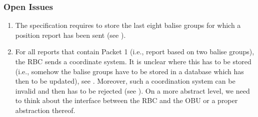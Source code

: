 \subsubsection{Open Issues}
\begin{enumerate}
	\item The specification requires to store the last eight balise groups for which a position report has been sent (see \cite[Chapter~3.6.2.2.2.c]{subset-026}).
	\item For all reports that contain Packet 1 (i.e., report based on two balise groups), the RBC sends a coordinate system. It is unclear where this has to be stored (i.e., somehow the balise groups have to be stored in a database which has then to be updated), see \cite[Chapter~3.4.2.3.3.6]{subset-026}. Moreover, such a coordination system can be invalid and then has to be rejected (see \cite[Chapter~3.4.2.3.3.7-8]{subset-026}). On a more abstract level, we need to think about the interface between the RBC and the OBU or a proper abstraction thereof.
\end{enumerate}
